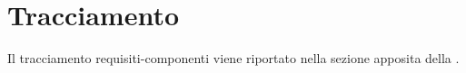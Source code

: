 \clearpage
\section{Tracciamento}
Il tracciamento requisiti-componenti viene riportato nella sezione apposita della \ST{}.